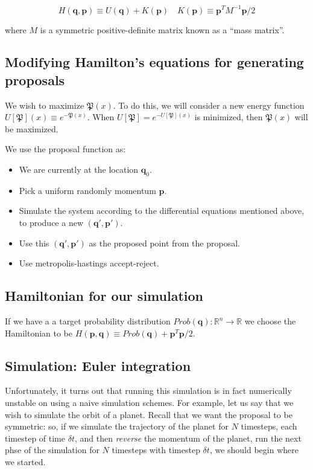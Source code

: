 \documentclass[titlepage]{article}
\newcommand{\R}{\mathbb{R}}
\newcommand{\p}{\mathbf{p}}
\newcommand{\q}{\mathbf{q}}
\renewcommand{\P}{\mathfrak{P}}
\begin{document}
$$ H(\q, \p) \equiv  U(\q) + K(\p) \quad K(\p) \equiv \p^T M^{-1} \p/2 $$

where $M$ is a symmetric positive-definite matrix known as a ``mass matrix''.


\subsection{Modifying Hamilton's equations for generating proposals}

We wish to maximize $\P(x)$. To do this, we will consider a new energy 
function $U[\P](x) \equiv e^{-\P(x)}$. When $U[\P] = e^{-U[\P](x)}$
is minimized, then $\P(x)$ will be maximized.

We use the proposal function as:
\begin{itemize}
    \item We are currently at the location $\q_0$.
    \item Pick a uniform randomly momentum $\p$.
    \item Simulate the system according to the differential equations mentioned
        above, to produce a new $(\q', \p')$.
    \item Use this $(\q', \p')$ as the proposed point from the proposal.
    \item Use metropolis-hastings accept-reject.
\end{itemize}




\subsection{Hamiltonian for our simulation}
If we have a a target probability distribution $Prob(\q): \R^n \rightarrow \R$
we choose the Hamiltonian to be $H(\p, \q) \equiv Prob(\q) + \p^T \p/2$.


\subsection{Simulation: Euler integration}
Unfortunately, it turns out that running this simulation is in fact numerically
unstable on using a naive simulation schemes. For example, let us say
that we wish to simulate the orbit of a planet. Recall that we want
the proposal to be symmetric: so, if we simulate the trajectory of the planet
for $N$ timesteps, each timestep of time $\delta t$, and then \emph{reverse}
the momentum of the planet, run the next phse of the simulation for $N$ timesteps
with timestep $\delta t$, we should begin where we started. 
\end{document}
